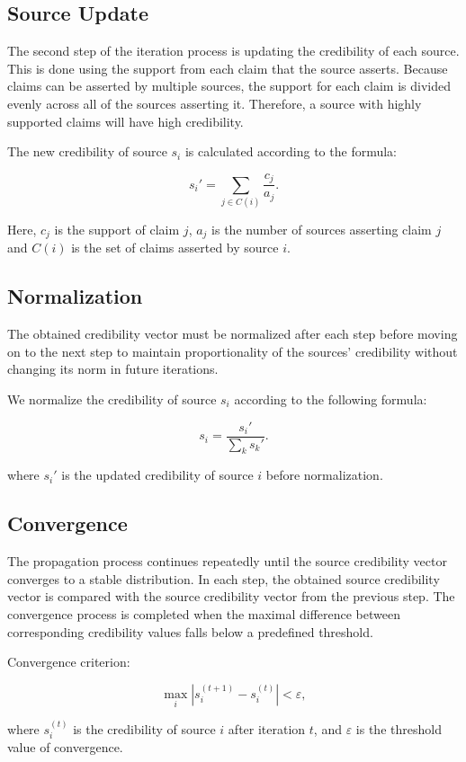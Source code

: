 \subsection{Source Update}

The second step of the iteration process is updating the credibility of each source. This is done using the support from each claim that the source asserts. Because claims can be asserted by multiple sources, the support for each claim is divided evenly across all of the sources asserting it. Therefore, a source with highly supported claims will have high credibility.

The new credibility of source $s_i$ is calculated according to the formula:

\begin{equation}
s_i' =
\sum_{j \in C(i)}
\frac{c_j}{a_j}.
\end{equation}

Here, $c_j$ is the support of claim $j$, $a_j$ is the number of sources asserting claim $j$ and $C(i)$ is the set of claims asserted by source $i$.

\subsection{Normalization}

The obtained credibility vector must be normalized after each step before moving on to the next step to maintain proportionality of the sources' credibility without changing its norm in future iterations.

We normalize the credibility of source $s_i$ according to the following formula:

\begin{equation}
s_i =
\frac{s_i'}
{\sum_k s_k'}.
\end{equation}

where $s_i'$ is the updated credibility of source $i$ before normalization.

\subsection{Convergence}

The propagation process continues repeatedly until the source credibility vector converges to a stable distribution. In each step, the obtained source credibility vector is compared with the source credibility vector from the previous step. The convergence process is completed when the maximal difference between corresponding credibility values falls below a predefined threshold.

Convergence criterion:

\begin{equation}
\max_i
\left|
s_i^{(t+1)}
-
s_i^{(t)}
\right|
<
\varepsilon,
\end{equation}

where $s_i^{(t)}$ is the credibility of source $i$ after iteration $t$, and $\varepsilon$ is the threshold value of convergence.